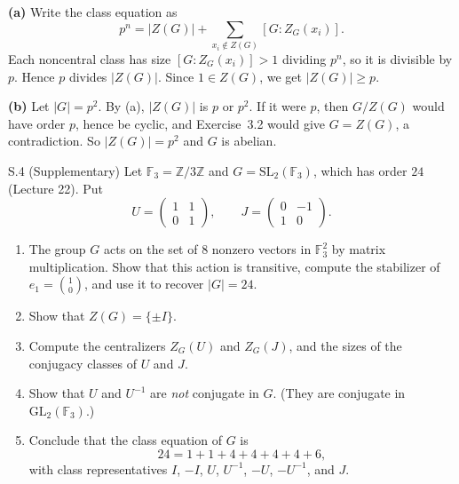 \documentclass[11pt]{article}
\newcommand{\Z}{\mathbb{Z}}
\newcommand{\F}{\mathbb{F}}
\newcommand{\SL}{\mathrm{SL}}
\newcommand{\GL}{\mathrm{GL}}
\begin{document}
\begin{solution}
\textbf{(a)} Write the class equation as
\[
  p^n=|Z(G)|+\sum_{x_i\notin Z(G)}[G:Z_G(x_i)].
\]
 Each noncentral class has size $[G:Z_G(x_i)]>1$ dividing $p^n$, so it is
 divisible by $p$. Hence $p$ divides $|Z(G)|$. Since $1\in Z(G)$, we get
 $|Z(G)|\geq p$.

\textbf{(b)} Let $|G|=p^2$. By (a), $|Z(G)|$ is $p$ or $p^2$. If it were
$p$, then $G/Z(G)$ would have order $p$, hence be cyclic, and
 Exercise~3.2 would give $G=Z(G)$, a contradiction. So $|Z(G)|=p^2$ and
$G$ is abelian.
\end{solution}

\begin{exercise}[breakable]{S.4 (Supplementary)}
Let $\F_3=\Z/3\Z$ and $G=\SL_2(\F_3)$, which has order $24$ (Lecture 22).
Put
\[
  U=\begin{pmatrix}1&1\\0&1\end{pmatrix},\qquad
  J=\begin{pmatrix}0&-1\\1&0\end{pmatrix}.
\]
\begin{enumerate}[label=\textbf{(\alph*)}]
  \item The group $G$ acts on the set of $8$ nonzero vectors in $\F_3^2$ by
        matrix multiplication. Show that this action is transitive, compute
        the stabilizer of $e_1=\binom10$, and use it to recover $|G|=24$.
  \item Show that $Z(G)=\{\pm I\}$.
  \item Compute the centralizers $Z_G(U)$ and $Z_G(J)$, and the sizes of
        the conjugacy classes of $U$ and $J$.
  \item Show that $U$ and $U^{-1}$ are \emph{not} conjugate in $G$.
        (They are conjugate in $\GL_2(\F_3)$.)
  \item Conclude that the class equation of $G$ is
        \[
          24=1+1+4+4+4+4+6,
        \]
        with class representatives $I$, $-I$, $U$, $U^{-1}$, $-U$, $-U^{-1}$, and $J$.
\end{enumerate}
\end{exercise}
\end{document}
